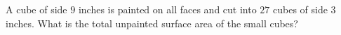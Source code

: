 A cube of side $9$ inches is painted on all faces and cut into $27$ cubes of side $3$ inches. What is the total unpainted surface area of the small cubes?
